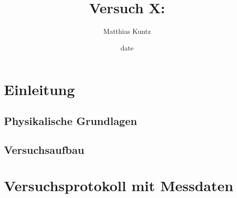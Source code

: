 \documentclass{article}
\title{Versuch X: }
\author{Matthias Kuntz}
\date{date}
\begin{document}
\maketitle

\tableofcontents

\newpage

\section{Einleitung}

\subsection{Physikalische Grundlagen}

\subsection{Versuchsaufbau}

\newpage

\section{Versuchsprotokoll mit Messdaten}
\end{document}
